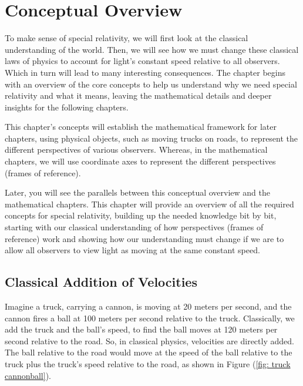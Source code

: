 \mainmatter
\chapter{Conceptual Overview} \label{ch: Conceptual Overview}

To make sense of special relativity, we will first look at the classical understanding of the world.
Then, we will see how we must change these classical laws of physics to account for light's constant speed relative to all observers.
Which in turn will lead to many interesting consequences.
The chapter begins with an overview of the core concepts to help us understand why we need special relativity and what it means, leaving the mathematical details and deeper insights for the following chapters.

This chapter's concepts will establish the mathematical framework for later chapters, using physical objects, such as moving trucks on roads, to represent the different perspectives of various observers.
Whereas, in the mathematical chapters, we will use coordinate axes to represent the different perspectives (frames of reference).

Later, you will see the parallels between this conceptual overview and the mathematical chapters.
This chapter will provide an overview of all the required concepts for special relativity, building up the needed knowledge bit by bit, starting with our classical understanding of how perspectives (frames of reference) work and showing how our understanding must change if we are to allow all observers to view light as moving at the same constant speed.

\section{Classical Addition of Velocities} \label{sect: Classical Addition of Velocities}

Imagine a truck, carrying a cannon, is moving at 20 meters per second, and the cannon fires a ball at 100 meters per second relative to the truck.
Classically, we add the truck and the ball's speed, to find the ball moves at 120 meters per second relative to the road.
So, in classical physics, velocities are directly added.
The ball relative to the road would move at the speed of the ball relative to the truck plus the truck's speed relative to the road, as shown in Figure (\ref{fig: truck cannonball}).

